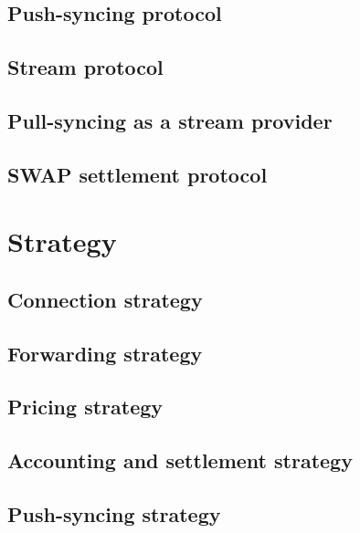 \section{Push-syncing protocol}\label{spec:protocol:push-sync}

\section{Stream protocol}\label{spec:protocol:stream}

\section{Pull-syncing as a stream provider}\label{spec:protocol:pull-sync}

\section{SWAP settlement protocol}\label{spec:protocol:swap}



\chapter{Strategy}\label{spec:strategy}
\section{Connection strategy}\label{spec:strategy:connection}
%
\section{Forwarding strategy}\label{spec:strategy:forwarding}

\section{Pricing strategy}\label{spec:strategy:pricing}

\section{Accounting and settlement strategy}\label{spec:strategy:swap}

\section{Push-syncing strategy}\label{spec:strategy:push-sync}

